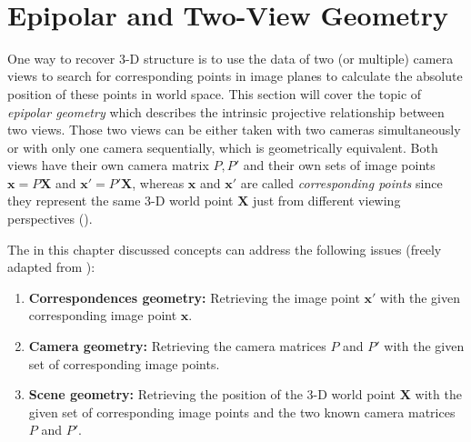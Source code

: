 
\\
\section{Epipolar and Two-View Geometry}
One way to recover 3-D structure is to use the data of two (or multiple) camera views to search for corresponding points in image planes to calculate the absolute position of these points in world space. This section will cover the topic of \textit{epipolar geometry} which describes the intrinsic projective relationship between two views. Those two views can be either taken with two cameras simultaneously or with only one camera sequentially, which is geometrically equivalent. Both views have their own camera matrix $P,P'$ and their own sets of image points $\mathbf{x}=P\mathbf{X}$ and $\mathbf{x'}=P'\mathbf{X}$, whereas $\mathbf{x}$ and $\mathbf{x'}$ are called \textit{corresponding points} since they represent the same 3-D world point $\mathbf{X}$ just from different viewing perspectives (\cite[p.238]{Hartley.2011}).

The in this chapter discussed concepts can address the following issues (freely adapted from \cite[p.238]{Hartley.2011}):
\begin{enumerate}[i]
\item \textbf{Correspondences geometry:} Retrieving the image point $\mathbf{x'}$ with the given corresponding image point $\mathbf{x}$.
\item \textbf{Camera geometry:} Retrieving the camera matrices $P$ and $P'$ with the given set of corresponding image points. 
\item \textbf{Scene geometry:} Retrieving the position of the 3-D world point $\mathbf{X}$ with the given set of corresponding image points and the two known camera matrices $P$ and $P'$. 
\end{enumerate}


